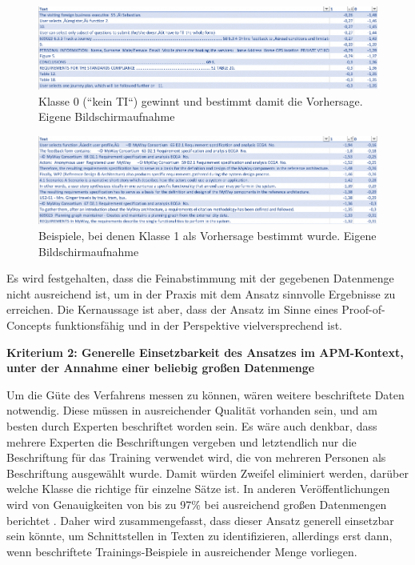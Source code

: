 \begin{figure}[h]
\centering
\includegraphics[scale=0.95]{content/pics/Picture_25.png}
\caption{Klasse 0 (``kein TI``) gewinnt und bestimmt damit die Vorhersage. Eigene Bildschirmaufnahme}
\label{Abbildung:bert-0}
\end{figure}

\begin{figure}[h]
\centering
\includegraphics[scale=0.95]{content/pics/Picture_26.png}
\caption{Beispiele, bei denen Klasse 1 als Vorhersage bestimmt wurde. Eigene Bildschirmaufnahme}
\label{Abbildung:bert-1}
\end{figure}

Es wird festgehalten, dass die Feinabstimmung mit der gegebenen Datenmenge nicht ausreichend ist, um in der Praxis mit dem Ansatz sinnvolle Ergebnisse zu erreichen. Die Kernaussage ist aber, dass der Ansatz im Sinne eines Proof-of-Concepts funktionsfähig und in der Perspektive vielversprechend ist.

{\bf Kriterium 2: Generelle Einsetzbarkeit des Ansatzes im APM-Kontext, unter der Annahme einer beliebig großen Datenmenge}

Um die Güte des Verfahrens messen zu können, wären weitere beschriftete Daten notwendig. Diese müssen in ausreichender Qualität vorhanden sein, und am besten durch Experten beschriftet worden sein. Es wäre auch denkbar, dass mehrere Experten die Beschriftungen vergeben und letztendlich nur die Beschriftung für das Training verwendet wird, die von mehreren Personen als Beschriftung ausgewählt wurde. Damit würden Zweifel eliminiert werden, darüber welche Klasse die richtige für einzelne Sätze ist. In anderen Veröffentlichungen wird von Genauigkeiten von bis zu 97\% bei ausreichend großen Datenmengen berichtet \cite{Tang}. Daher wird zusammengefasst, dass dieser Ansatz generell einsetzbar sein könnte, um Schnittstellen in Texten zu identifizieren, allerdings erst dann, wenn beschriftete Trainings-Beispiele in ausreichender Menge vorliegen.

